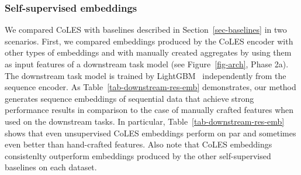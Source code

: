 \documentclass[sigconf, anonymous]{acmart}
\begin{document}
\subsubsection{Self-supervised embeddings}

We compared CoLES with baselines described in Section~\ref{sec-baselines} in two scenarios. First, we compared embeddings produced by the CoLES encoder with other types of embeddings and with manually created aggregates by using them as input features of a downstream task model (see Figure~\ref{fig-arch}, Phase 2a). The downstream task model is trained by LightGBM~\citep{Ke2017LightGBMAH} independently from the sequence encoder. As Table~\ref{tab-downstream-res-emb} demonstrates, our method generates sequence embeddings of sequential data that achieve strong performance results in comparison to the case of manually crafted features when used on the downstream tasks.
In particular, Table~\ref{tab-downstream-res-emb} shows that even unsupervised CoLES embeddings perform on par and sometimes even better than hand-crafted features. Also note that CoLES embeddings consistenlty outperform embeddings produced by the other self-supervised baselines on each dataset.

\end{document}
